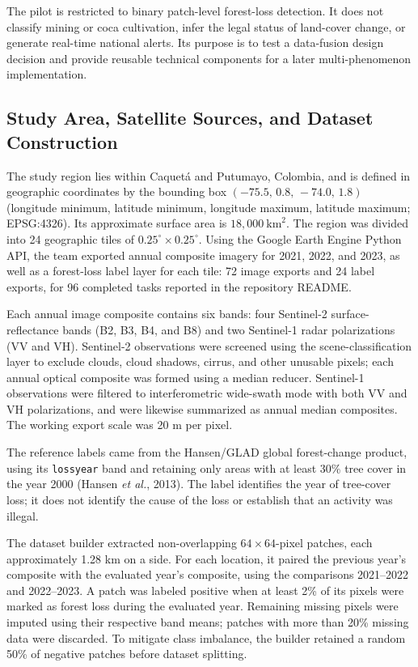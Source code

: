 \documentclass{article}
\begin{document}
The pilot is restricted to binary patch-level forest-loss detection. It does not classify mining or coca cultivation, infer the legal status of land-cover change, or generate real-time national alerts. Its purpose is to test a data-fusion design decision and provide reusable technical components for a later multi-phenomenon implementation.

\subsection{Study Area, Satellite Sources, and Dataset Construction}
\label{subsec:prototype-data}

The study region lies within Caquet\'a and Putumayo, Colombia, and is defined in geographic coordinates by the bounding box $(-75.5,\,0.8,\,-74.0,\,1.8)$ (longitude minimum, latitude minimum, longitude maximum, latitude maximum; EPSG:4326). Its approximate surface area is $18{,}000\ \mathrm{km}^{2}$. The region was divided into 24 geographic tiles of $0.25^{\circ}\times 0.25^{\circ}$. Using the Google Earth Engine Python API, the team exported annual composite imagery for 2021, 2022, and 2023, as well as a forest-loss label layer for each tile: 72 image exports and 24 label exports, for 96 completed tasks reported in the repository README.



Each annual image composite contains six bands: four Sentinel-2 surface-reflectance bands (B2, B3, B4, and B8) and two Sentinel-1 radar polarizations (VV and VH). Sentinel-2 observations were screened using the scene-classification layer to exclude clouds, cloud shadows, cirrus, and other unusable pixels; each annual optical composite was formed using a median reducer. Sentinel-1 observations were filtered to interferometric wide-swath mode with both VV and VH polarizations, and were likewise summarized as annual median composites. The working export scale was 20 m per pixel.

The reference labels came from the Hansen/GLAD global forest-change product, using its \texttt{lossyear} band and retaining only areas with at least 30\% tree cover in the year 2000 (Hansen \emph{et al.}, 2013). The label identifies the year of tree-cover loss; it does not identify the cause of the loss or establish that an activity was illegal.

The dataset builder extracted non-overlapping $64\times64$-pixel patches, each approximately 1.28 km on a side. For each location, it paired the previous year's composite with the evaluated year's composite, using the comparisons 2021--2022 and 2022--2023. A patch was labeled positive when at least 2\% of its pixels were marked as forest loss during the evaluated year. Remaining missing pixels were imputed using their respective band means; patches with more than 20\% missing data were discarded. To mitigate class imbalance, the builder retained a random 50\% of negative patches before dataset splitting.
\end{document}
